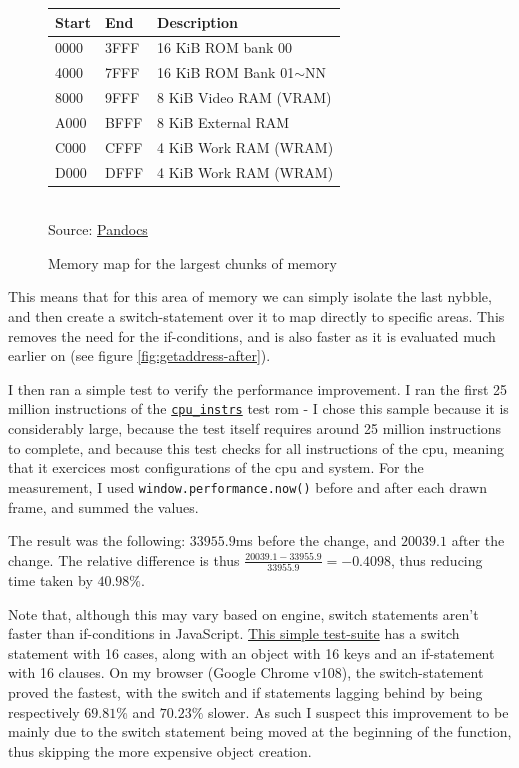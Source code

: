 \documentclass[11pt]{report}
\begin{document}
\begin{figure}[h]
    \centering
    \begin{tabular}{|l|l|l|}
    \hline
    \textbf{Start} & \textbf{End} & \textbf{Description} \\ \hline
    0000 & 3FFF & 16 KiB ROM bank 00 \\ \hline
    4000 & 7FFF & 16 KiB ROM Bank 01$\sim$NN \\ \hline
    8000 & 9FFF & 8 KiB Video RAM (VRAM) \\ \hline
    A000 & BFFF & 8 KiB External RAM \\ \hline
    C000 & CFFF & 4 KiB Work RAM (WRAM) \\ \hline
    D000 & DFFF & 4 KiB Work RAM (WRAM) \\ \hline
    \end{tabular}\\
    Source: \href{https://gbdev.io/pandocs/Memory_Map.html}{Pandocs}
    \caption{Memory map for the largest chunks of memory}
    \label{fig:memory-map-largest}
\end{figure}

This means that for this area of memory we can simply isolate the last nybble, and then create a switch-statement over it to map directly to specific areas. This removes the need for the if-conditions, and is also faster as it is evaluated much earlier on (see figure \ref{fig:getaddress-after}).

I then ran a simple test to verify the performance improvement. I ran the first 25 million instructions of the \href{https://github.com/retrio/gb-test-roms/tree/master/cpu_instrs}{\texttt{cpu\_instrs}} test \gls{rom} - I chose this sample because it is considerably large, because the test itself requires around 25 million instructions to complete, and because this test checks for all instructions of the \gls{cpu}, meaning that it exercices most configurations of the \gls{cpu} and system. For the measurement, I used \texttt{window.performance.now()} before and after each drawn frame, and summed the values.

The result was the following: $33 955.9$ms before the change, and $20 039.1$ after the change. The relative difference is thus $\frac{20 039.1-33 955.9}{33 955.9}=-0.4098$, thus reducing time taken by $40.98\%$.

Note that, although this may vary based on engine, switch statements aren't faster than if-conditions in JavaScript. \href{https://jsbench.me/qqlbqix93t/1}{This simple test-suite} has a switch statement with 16 cases, along with an object with 16 keys and an if-statement with 16 clauses. On my browser (Google Chrome v108), the switch-statement proved the fastest, with the switch and if statements lagging behind by being respectively $69.81\%$ and $70.23\%$ slower. As such I suspect this improvement to be mainly due to the switch statement being moved at the beginning of the function, thus skipping the more expensive object creation.
\end{document}

